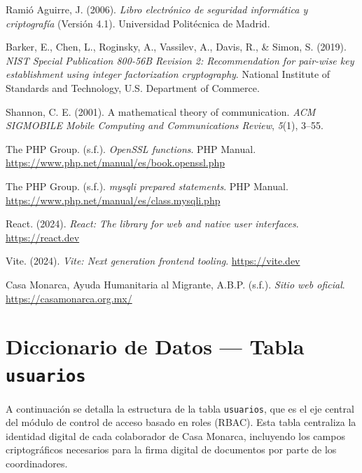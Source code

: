 \documentclass[10pt,letterpaper]{report}
\begin{document}
\begin{enumerate}[label={[\arabic*]}]
  \item Ramió Aguirre, J. (2006). \textit{Libro electrónico de seguridad informática y criptografía} (Versión 4.1). Universidad Politécnica de Madrid.

  \item Barker, E., Chen, L., Roginsky, A., Vassilev, A., Davis, R., \& Simon, S. (2019). \textit{NIST Special Publication 800-56B Revision 2: Recommendation for pair-wise key establishment using integer factorization cryptography}. National Institute of Standards and Technology, U.S. Department of Commerce.

  \item Shannon, C. E. (2001). A mathematical theory of communication. \textit{ACM SIGMOBILE Mobile Computing and Communications Review}, \textit{5}(1), 3--55.

  \item The PHP Group. (s.f.). \textit{OpenSSL functions}. PHP Manual. \url{https://www.php.net/manual/es/book.openssl.php}

  \item The PHP Group. (s.f.). \textit{mysqli prepared statements}. PHP Manual. \url{https://www.php.net/manual/es/class.mysqli.php}

  \item React. (2024). \textit{React: The library for web and native user interfaces}. \url{https://react.dev}

  \item Vite. (2024). \textit{Vite: Next generation frontend tooling}. \url{https://vite.dev}

  \item Casa Monarca, Ayuda Humanitaria al Migrante, A.B.P. (s.f.). \textit{Sitio web oficial}. \url{https://casamonarca.org.mx/}
\end{enumerate}

\appendix

\chapter{Diccionario de Datos — Tabla \texttt{usuarios}}
\label{anx:diccionario}

A continuación se detalla la estructura de la tabla \texttt{usuarios}, que es el eje central del módulo de control de acceso basado en roles (RBAC). Esta tabla centraliza la identidad digital de cada colaborador de Casa Monarca, incluyendo los campos criptográficos necesarios para la firma digital de documentos por parte de los coordinadores.
\end{document}
